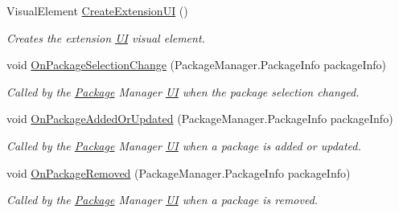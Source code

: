 \begin{DoxyCompactItemize}
\item 
Visual\+Element \mbox{\hyperlink{interface_unity_editor_1_1_package_manager_1_1_u_i_1_1_i_package_manager_extension_a32866f98b536a8863de4cfc598d8ea7d}{Create\+Extension\+UI}} ()
\begin{DoxyCompactList}\small\item\em Creates the extension \mbox{\hyperlink{namespace_unity_editor_1_1_package_manager_1_1_u_i}{UI}} visual element. \end{DoxyCompactList}\item 
void \mbox{\hyperlink{interface_unity_editor_1_1_package_manager_1_1_u_i_1_1_i_package_manager_extension_acc9b57b0146dac8d56f457c3a35d64a5}{On\+Package\+Selection\+Change}} (Package\+Manager.\+Package\+Info package\+Info)
\begin{DoxyCompactList}\small\item\em Called by the \mbox{\hyperlink{class_unity_editor_1_1_package_manager_1_1_u_i_1_1_package}{Package}} Manager \mbox{\hyperlink{namespace_unity_editor_1_1_package_manager_1_1_u_i}{UI}} when the package selection changed. \end{DoxyCompactList}\item 
void \mbox{\hyperlink{interface_unity_editor_1_1_package_manager_1_1_u_i_1_1_i_package_manager_extension_a89228b54f05cae1c6b04f323c13f3563}{On\+Package\+Added\+Or\+Updated}} (Package\+Manager.\+Package\+Info package\+Info)
\begin{DoxyCompactList}\small\item\em Called by the \mbox{\hyperlink{class_unity_editor_1_1_package_manager_1_1_u_i_1_1_package}{Package}} Manager \mbox{\hyperlink{namespace_unity_editor_1_1_package_manager_1_1_u_i}{UI}} when a package is added or updated. \end{DoxyCompactList}\item 
void \mbox{\hyperlink{interface_unity_editor_1_1_package_manager_1_1_u_i_1_1_i_package_manager_extension_a9f2d1be5e21ec127b32e8138f25b38a1}{On\+Package\+Removed}} (Package\+Manager.\+Package\+Info package\+Info)
\begin{DoxyCompactList}\small\item\em Called by the \mbox{\hyperlink{class_unity_editor_1_1_package_manager_1_1_u_i_1_1_package}{Package}} Manager \mbox{\hyperlink{namespace_unity_editor_1_1_package_manager_1_1_u_i}{UI}} when a package is removed. \end{DoxyCompactList}\end{DoxyCompactItemize}


